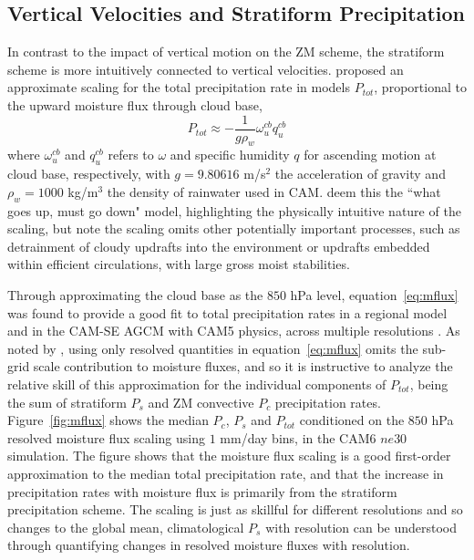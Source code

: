 \documentclass[times]{qjrms4}
\begin{document}
\subsection{Vertical Velocities and Stratiform Precipitation}

In contrast to the impact of vertical motion on the ZM scheme, the stratiform scheme is more intuitively connected to vertical velocities. \cite{RETAL2016CD} proposed an approximate scaling for the total precipitation rate in models $P_{tot}$, proportional to the upward moisture flux through cloud base,
\begin{equation}
P_{tot} \approx -\frac{1}{g\rho_{w}} \omega^{cb}_u q^{cb}_u \label{eq:mflux}
\end{equation}
where $\omega^{cb}_u$ and $q^{cb}_u$ refers to $\omega$ and specific humidity $q$ for ascending motion at cloud base, respectively, with $g=9.80616$ m/s$^2$ the acceleration of gravity and $\rho_w=1000$ kg/m$^3$ the density of rainwater used in CAM. \cite{OETAL2016JAMES} deem this the ``what goes up, must go down" model, highlighting the physically intuitive nature of the scaling, but note the scaling omits other potentially important processes, such as detrainment of cloudy updrafts into the environment or updrafts embedded within efficient circulations, with large gross moist stabilities.

Through approximating the cloud base as the $850$ hPa level, equation~\ref{eq:mflux} was found to provide a good fit to total precipitation rates in a regional model \citep{RETAL2016CD} and in the CAM-SE AGCM with CAM5 physics, across multiple resolutions \citep{OETAL2016JAMES}. As noted by \cite{RETAL2016CD}, using only resolved quantities in equation~\ref{eq:mflux} omits the sub-grid scale contribution to moisture fluxes, and so it is instructive to analyze the relative skill of this approximation for the individual components of $P_{tot}$, being the sum of stratiform $P_s$ and ZM convective $P_c$ precipitation rates. Figure~\ref{fig:mflux} shows the median $P_c$, $P_s$ and $P_{tot}$ conditioned on the $850$ hPa resolved moisture flux scaling using $1$ mm/day bins, in the CAM6 $ne30$ simulation. The figure shows that the moisture flux scaling is a good first-order approximation to the median total precipitation rate, and that the increase in precipitation rates with moisture flux is primarily from the stratiform precipitation scheme. The scaling is just as skillful for different resolutions \citep[not shown;][]{OETAL2016JAMES} and so changes to the global mean, climatological $P_s$ with resolution can be understood through quantifying changes in resolved moisture fluxes with resolution.
\end{document}
